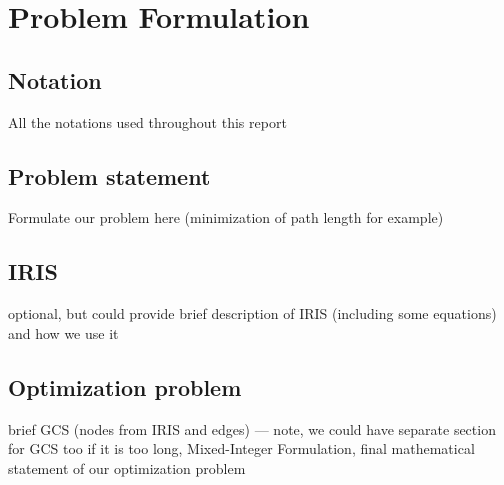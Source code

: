 \section{Problem Formulation}

\subsection{Notation}
All the notations used throughout this report

\subsection{Problem statement}
Formulate our problem here (minimization of path length for example)

\subsection{IRIS}
optional, but could provide brief description of IRIS (including some equations) and how we use it

\subsection{Optimization problem}

brief GCS (nodes from IRIS and edges) --- note, we could have separate section for GCS too if it is too long, Mixed-Integer Formulation, final mathematical statement of our optimization problem